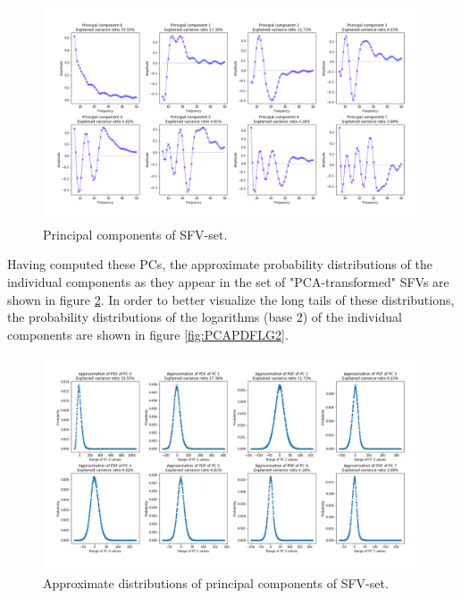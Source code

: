 \documentclass{kththesis}
\begin{document}
\begin{figure}[H]
    \centering
    \centerline{\includegraphics[width=1\textwidth]{images/PCA/PCS.png}}
    \caption{Principal components of SFV-set.}
    \label{fig:PCS}
\end{figure}

Having computed these PCs, the approximate probability distributions of the individual components as they appear in the set of "PCA-transformed" SFVs are shown in figure \ref{fig:PCAPDF}. 
In order to better visualize the long tails of these distributions, the probability distributions of the logarithms (base 2) of the individual components are shown in figure \ref{fig:PCAPDFLG2}.

\begin{figure}[H]
    \centering
    \centerline{\includegraphics[width=1\textwidth]{images/PCA/PCAPDF.png}}
    \caption{Approximate distributions of principal components of SFV-set.}
    \label{fig:PCAPDF}
\end{figure}
\end{document}
